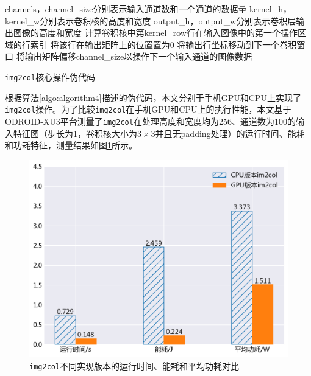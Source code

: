 \begin{algorithm}[htbp]
  \small
  \SetAlgoLined
    \begin{spacing}{0.8}
    channels，channel\_size分别表示输入通道数和一个通道的数据量\;
    kernel\_h，kernel\_w分别表示卷积核的高度和宽度\;
  output\_h，output\_w分别表示卷积层输出图像的高度和宽度\;
     {
         {
             {
                计算卷积核中第kernel\_row行在输入图像中的第一个操作区域的行索引\;
                 {
                     {
                         {
                            将该行在输出矩阵上的位置置为0\;
                        }
                    } 
                    将输出行坐标移动到下一个卷积窗口\;
                }
            }
        }
        将输出矩阵偏移channel\_size以操作下一个输入通道的图像数据\;
    }
    \end{spacing}
  \caption{\texttt{img2col}核心操作伪代码}
  \label{algo:algorithm4}
\end{algorithm}

根据算法\ref{algo:algorithm4}描述的伪代码，本文分别于手机GPU和CPU上实现了\texttt{img2col}操作。为了比较\texttt{img2col}在手机GPU和CPU上的执行性能，本文基于ODROID-XU3平台测量了\texttt{img2col}在处理高度和宽度均为256、通道数为100的输入特征图（步长为1，卷积核大小为$3 \times 3$并且无padding处理）的运行时间、能耗和功耗特征，测量结果如图\ref{figure:figure11}所示。

\begin{figure}[htbp]
    \begin{center}
    \includegraphics[height=0.4\textwidth]{figures/im2col_energy.pdf}
    \end{center}
    \caption{\texttt{img2col}不同实现版本的运行时间、能耗和平均功耗对比}\label{figure:figure11}
\end{figure}

